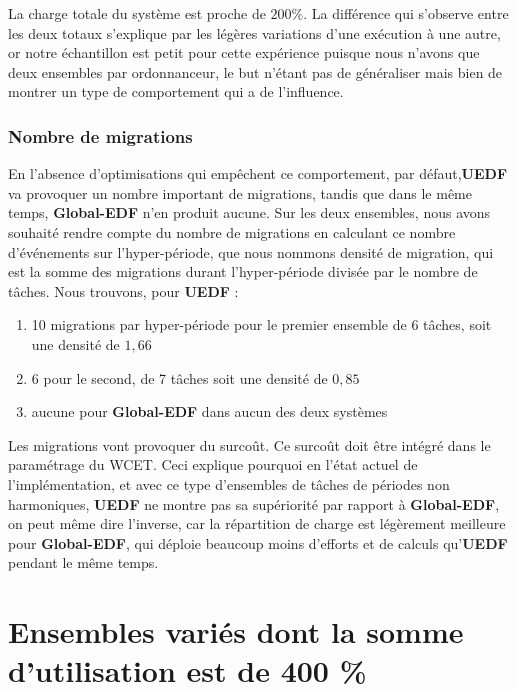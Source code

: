 	La charge totale du système est proche de $200\%$. La différence qui s'observe 
	entre les deux totaux s'explique par les légères variations d'une exécution à une autre, or notre échantillon est 
	petit pour cette expérience puisque nous n'avons que deux ensembles par ordonnanceur, le but n'étant pas de 
	généraliser mais bien de montrer un type de comportement qui a de l'influence.\newline
	
	
	\subsubsection{Nombre de migrations}
	
	En l'absence d'optimisations qui empêchent ce comportement, par défaut,\textbf{UEDF} va provoquer un nombre 
	important de migrations, tandis que dans le même temps, \textbf{Global-EDF} n'en produit aucune.
	Sur les deux ensembles, nous avons souhaité rendre compte du nombre de migrations en calculant 
	ce nombre d'événements sur l'hyper-période, que nous nommons \og{}densité de migration\fg{}, qui est 
	la somme des migrations durant l'hyper-période divisée par le nombre de tâches. 
	Nous trouvons, pour \textbf{UEDF} : 
	\begin{enumerate}
		\item 10 migrations par hyper-période pour le premier ensemble de 6 tâches, soit une densité de $1,66$
		\item 6 pour le second, de 7 tâches soit une densité de $0,85$
		\item aucune pour \textbf{Global-EDF} dans aucun des deux systèmes
	\end{enumerate}

	Les migrations vont provoquer du surcoût. Ce surcoût doit être intégré dans le paramétrage du WCET. 
	Ceci explique pourquoi en l'état actuel de l'implémentation, et avec ce type d'ensembles de tâches 
	de périodes non harmoniques, \textbf{UEDF} ne montre pas sa 
	supériorité par rapport à \textbf{Global-EDF}, on peut même dire l'inverse, car 
	la répartition de charge est légèrement meilleure pour \textbf{Global-EDF}, qui déploie 
	beaucoup moins d'efforts et de calculs qu'\textbf{UEDF} pendant le même temps.\newline
	
	
\section{Ensembles variés dont la somme d'utilisation est de 400 \%}

